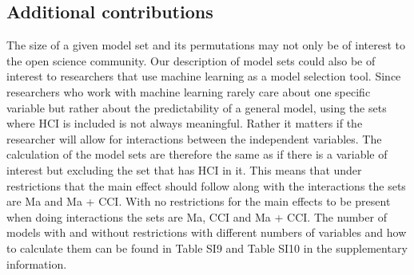 \subsection{Additional contributions}
The size of a given model set and its permutations may not only be of interest to the open science community. Our description of model sets could also be of interest to researchers that use machine learning as a model selection tool. Since researchers who work with machine learning rarely care about one specific variable but rather about the predictability of a general model, using the sets where HCI is included is not always meaningful. Rather it matters if the researcher will allow for interactions between the independent variables. The calculation of the model sets are therefore the same as if there is a variable of interest but excluding the set that has HCI in it. This means that under restrictions that the main effect should follow along with the interactions the sets are Ma and Ma + CCI. With no restrictions for the main effects to be present when doing interactions the sets are Ma, CCI and Ma + CCI. The number of models with and without restrictions with different numbers of variables and how to calculate them can be found in Table SI9 and Table SI10 in the supplementary information. 


 
